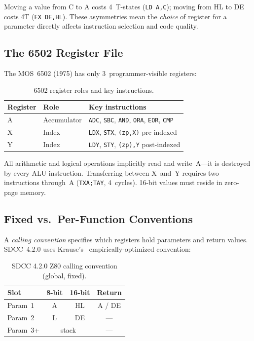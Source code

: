 \documentclass[sigplan,screen,nonacm]{acmart}
\begin{document}
\noindent Moving a value from C to A costs 4~T-states (\texttt{LD~A,C});
moving from HL to DE costs 4T (\texttt{EX~DE,HL}).  These asymmetries mean
the \emph{choice} of register for a parameter directly affects instruction
selection and code quality.

\subsection{The 6502 Register File}
\label{sec:6502regs}

The MOS~6502 (1975) has only 3~programmer-visible registers:

\begin{table}[h]
\centering\small
\caption{6502 register roles and key instructions.}
\label{tab:6502regs}
\begin{tabular}{@{}lll@{}}
\toprule
Register & Role & Key instructions \\
\midrule
A & Accumulator & \texttt{ADC}, \texttt{SBC}, \texttt{AND}, \texttt{ORA}, \texttt{EOR}, \texttt{CMP} \\
X & Index       & \texttt{LDX}, \texttt{STX}, \texttt{(zp,X)} pre-indexed \\
Y & Index       & \texttt{LDY}, \texttt{STY}, \texttt{(zp),Y} post-indexed \\
\bottomrule
\end{tabular}
\end{table}

\noindent All arithmetic and logical operations implicitly read and
write~A---it is destroyed by every ALU instruction.  Transferring between
X~and~Y requires two instructions through~A (\texttt{TXA;TAY}, 4~cycles).
16-bit values must reside in zero-page memory.

\subsection{Fixed vs.\ Per-Function Conventions}

A \emph{calling convention} specifies which registers hold parameters and
return values.  SDCC~4.2.0 uses Krause's~\cite{krause2022}
empirically-optimized convention:

\begin{table}[h]
\centering\small
\caption{SDCC 4.2.0 Z80 calling convention (global, fixed).}
\label{tab:sdcc-cc}
\begin{tabular}{@{}lccc@{}}
\toprule
Slot    & 8-bit & 16-bit & Return \\
\midrule
Param~1 & A     & HL     & A / DE \\
Param~2 & L     & DE     & --- \\
Param~3+ & \multicolumn{2}{c}{stack} & --- \\
\bottomrule
\end{tabular}
\end{table}
\end{document}

